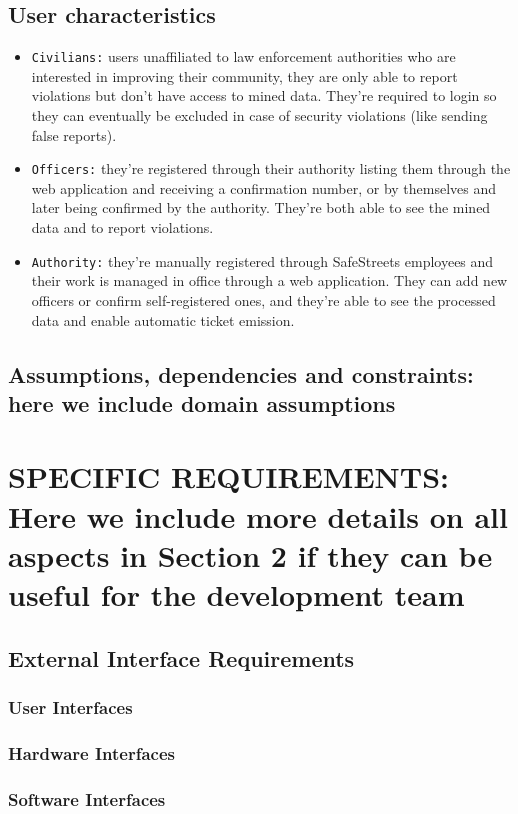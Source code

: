 \documentclass[12pt,a4paper]{article}
\begin{document}
\subsection{User	characteristics}
 \begin{itemize}
\item \texttt{Civilians:} users unaffiliated to law enforcement authorities who are interested in improving their community, they are only able to report violations but don't have access to mined data. They're required to login so they can eventually be excluded in case of security violations (like sending false reports).
\item \texttt{Officers:} they're registered through their authority listing them through the web application and receiving a confirmation number, or by themselves and later being confirmed by the authority. They're both able to see the mined data and to report violations.
\item  \texttt{Authority:} they're manually registered through SafeStreets employees and their work is managed in office through a web application. They can add new officers or confirm self-registered ones, and they're able to see the processed data and enable automatic ticket emission.
\end{itemize}
\subsection{Assumptions, dependencies and	constraints:	here	we	include domain	assumptions	} 
\section{SPECIFIC	REQUIREMENTS: Here	we	include	more	details	on	all	aspects	in	Section	2	if	they	
can	be	useful	for	the	development	team}
\subsection{External	Interface	Requirements} 
\subsubsection{User	Interfaces}
\subsubsection{Hardware	Interfaces}
\subsubsection{Software	Interfaces}
\end{document}
